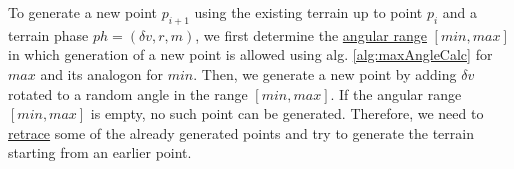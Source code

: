 To generate a new point $p_{i+1}$ using the existing terrain up to point $p_i$ and a terrain phase $ph = (\delta v, r, m)$, we first determine the \hyperref[angleRange]{angular range} $[min, max]$ in which generation of a new point is allowed using alg. \ref{alg:maxAngleCalc} for $max$ and its analogon for $min$.
Then, we generate a new point by adding $\delta v$ rotated to a random angle in the range $[min , max]$. 
If the angular range $[min, max]$ is empty, no such point can be generated. 
Therefore, we need to \hyperref[retracing]{retrace} some of the already generated points and try to generate the terrain starting from an earlier point.

%

